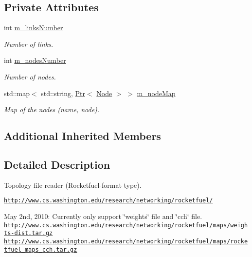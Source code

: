 \subsection*{Private Attributes}
\begin{DoxyCompactItemize}
\item 
int \hyperlink{classns3_1_1RocketfuelTopologyReader_af05d006d96b5314535548ec5f6b82ecc}{m\+\_\+links\+Number}
\begin{DoxyCompactList}\small\item\em Number of links. \end{DoxyCompactList}\item 
int \hyperlink{classns3_1_1RocketfuelTopologyReader_a7e820cdd94908dc1665d0530d5566ada}{m\+\_\+nodes\+Number}
\begin{DoxyCompactList}\small\item\em Number of nodes. \end{DoxyCompactList}\item 
std\+::map$<$ std\+::string, \hyperlink{classns3_1_1Ptr}{Ptr}$<$ \hyperlink{classns3_1_1Node}{Node} $>$ $>$ \hyperlink{classns3_1_1RocketfuelTopologyReader_a67cfa4105f0424a6bd04479437c8dd7e}{m\+\_\+node\+Map}
\begin{DoxyCompactList}\small\item\em Map of the nodes (name, node). \end{DoxyCompactList}\end{DoxyCompactItemize}
\subsection*{Additional Inherited Members}


\subsection{Detailed Description}
Topology file reader (Rocketfuel-\/format type). 

\href{http://www.cs.washington.edu/research/networking/rocketfuel/}{\tt http\+://www.\+cs.\+washington.\+edu/research/networking/rocketfuel/}

May 2nd, 2010\+: Currently only support \char`\"{}weights\char`\"{} file and \char`\"{}cch\char`\"{} file. \href{http://www.cs.washington.edu/research/networking/rocketfuel/maps/weights-dist.tar.gz}{\tt http\+://www.\+cs.\+washington.\+edu/research/networking/rocketfuel/maps/weights-\/dist.\+tar.\+gz} \href{http://www.cs.washington.edu/research/networking/rocketfuel/maps/rocketfuel_maps_cch.tar.gz}{\tt http\+://www.\+cs.\+washington.\+edu/research/networking/rocketfuel/maps/rocketfuel\+\_\+maps\+\_\+cch.\+tar.\+gz} 

